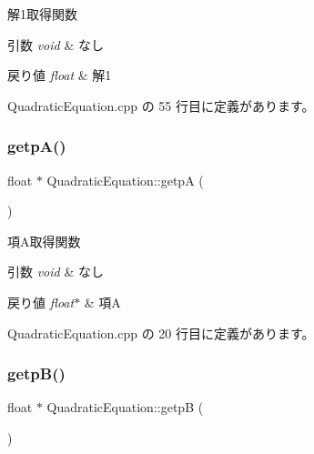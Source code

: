 解1取得関数 


\begin{DoxyParams}{引数}
{\em void} & なし \\
\hline
\end{DoxyParams}

\begin{DoxyRetVals}{戻り値}
{\em float} & 解1 \\
\hline
\end{DoxyRetVals}


 Quadratic\+Equation.\+cpp の 55 行目に定義があります。

\mbox{\label{class_quadratic_equation_a5584822a5a5cf92350543d6093a594c6}} 
\subsubsection{\texorpdfstring{getp\+A()}{getpA()}}
{\footnotesize\ttfamily float $\ast$ Quadratic\+Equation\+::getpA (\begin{DoxyParamCaption}{ }\end{DoxyParamCaption})}



項\+A取得関数 


\begin{DoxyParams}{引数}
{\em void} & なし \\
\hline
\end{DoxyParams}

\begin{DoxyRetVals}{戻り値}
{\em float$\ast$} & 項A \\
\hline
\end{DoxyRetVals}


 Quadratic\+Equation.\+cpp の 20 行目に定義があります。

\mbox{\label{class_quadratic_equation_a443ffd465aee16fbb14107e5e889890b}} 
\subsubsection{\texorpdfstring{getp\+B()}{getpB()}}
{\footnotesize\ttfamily float $\ast$ Quadratic\+Equation\+::getpB (\begin{DoxyParamCaption}{ }\end{DoxyParamCaption})}



